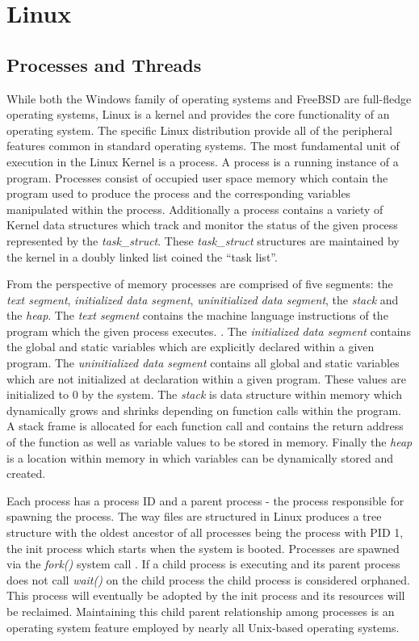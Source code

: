 
\section{\bf Linux}
  \subsection{\bf Processes and Threads}
    \normalfont \indent While both the Windows family of operating systems and FreeBSD are full-fledge operating systems, Linux is a kernel and provides the core functionality of an operating system. The specific Linux distribution provide all of the peripheral features common in standard operating systems. The most fundamental unit of execution in the Linux Kernel is a process. A process is a running instance of a program. Processes consist of occupied user space memory which contain the program used to produce the process and the corresponding variables manipulated within the process. Additionally a process contains a variety of Kernel data structures which track and monitor the status of the given process represented by the \textit{task\_struct}. These \textit{task\_struct} structures are maintained by the kernel in a doubly linked list coined the “task list”.

    \normalfont \indent From the perspective of memory processes are comprised of five segments: the \textit{text segment}, \textit{initialized data segment}, \textit{uninitialized data segment}, the \textit{stack} and the \textit{heap}. The \textit{text segment} contains the machine language instructions of the program which the given process executes. \cite{linuxProgInterface2010}. The \textit{initialized data segment} contains the global and static variables which are explicitly declared within a given program. The \textit{uninitialized data segment} contains all global and static variables which are not initialized at declaration within a given program. These values are initialized to 0 by the system. The \textit{stack} is data structure within memory which dynamically grows and shrinks depending on function calls within the program. A stack frame is allocated for each function call and contains the return address of the function as well as variable values to be stored in memory. Finally the \textit{heap} is a location within memory in which variables can be dynamically stored and created.

    \normalfont \indent Each process has a process ID and a parent process - the process responsible for spawning the process. The way files are structured in Linux produces a tree structure with the oldest ancestor of all processes being the process with PID 1, the init process which starts when the system is booted. Processes are spawned via the \textit{fork()} system call \cite{linuxProgInterface2010}. If a child process is executing and its parent process does not call \textit{wait()} on the child process the child process is considered orphaned. This process will eventually be adopted by the init process and its resources will be reclaimed. Maintaining this child parent relationship among processes is an operating system feature employed by nearly all Unix-based operating systems.

